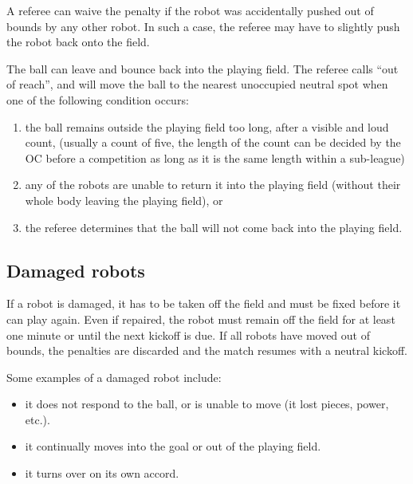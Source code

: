 \documentclass{article}
\begin{document}
A referee can waive the penalty if the robot was accidentally pushed out of
bounds by any other robot. In such a case, the
referee may have to slightly push the robot back onto the field.

The ball can leave and bounce back into the playing field. The referee calls
``out of reach'', and will move the ball to the nearest unoccupied neutral spot
when one of the following condition occurs:

\begin{enumerate}
    \item the ball remains outside the playing field too long,
        after a visible and loud count, (usually a count of five, the length of
        the count can be decided by the OC before a competition as long as it
        is the same length within a sub-league)

    \item any of the robots are unable to return it into the playing field
        (without their whole body leaving the playing field), or

    \item the referee determines that the ball will not come back into the
        playing field.

\end{enumerate}

\subsection{Damaged robots \label{ref-012}}

If a robot is damaged, it has to be taken off the field and must be fixed
before it can play again. Even if repaired, the robot must remain off the field
for at least one minute or until the next kickoff is due. If all robots have
moved out of bounds, the penalties are discarded and the match resumes with a
neutral kickoff.

Some examples of a damaged robot include:

\begin{itemize}

\item it does not respond to the ball, or is unable to move (it lost pieces,
    power, etc.).

\item it continually moves into the goal or out of the playing field.

\item it turns over on its own accord.

\end{itemize}
\end{document}

